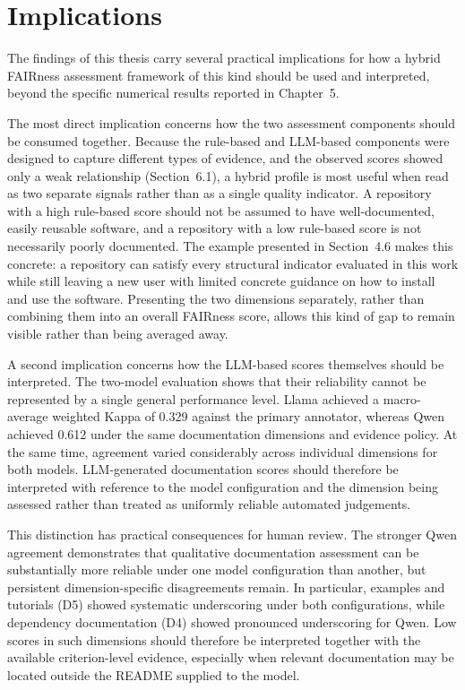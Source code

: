 \section{Implications}

The findings of this thesis carry several practical implications for
how a hybrid FAIRness assessment framework of this kind should be
used and interpreted, beyond the specific numerical results reported
in Chapter~5.

The most direct implication concerns how the two assessment
components should be consumed together. Because the rule-based and
LLM-based components were designed to capture different types of
evidence, and the observed scores showed only a weak relationship
(Section~6.1), a hybrid profile is most useful when read as two
separate signals rather than as a single quality indicator. A
repository with a high rule-based score should not be assumed to
have well-documented, easily reusable software, and a repository
with a low rule-based score is not necessarily poorly documented.
The example presented in Section~4.6 makes this concrete: a
repository can satisfy every structural indicator evaluated in
this work while still leaving a new user with limited concrete
guidance on how to install and use the software. Presenting
the two dimensions separately, rather than combining them into an
overall FAIRness score, allows this kind of gap to remain visible
rather than being averaged away.

A second implication concerns how the LLM-based scores themselves
should be interpreted. The two-model evaluation shows that their
reliability cannot be represented by a single general performance
level. Llama achieved a macro-average weighted Kappa of 0.329 against
the primary annotator, whereas Qwen achieved 0.612 under the same
documentation dimensions and evidence policy. At the same time,
agreement varied considerably across individual dimensions for both
models. LLM-generated documentation scores should therefore be
interpreted with reference to the model configuration and the
dimension being assessed rather than treated as uniformly reliable
automated judgements.

This distinction has practical consequences for human review. The
stronger Qwen agreement demonstrates that qualitative documentation
assessment can be substantially more reliable under one model
configuration than another, but persistent dimension-specific
disagreements remain. In particular, examples and tutorials (D5)
showed systematic underscoring under both configurations, while
dependency documentation (D4) showed pronounced underscoring for
Qwen. Low scores in such dimensions should therefore be interpreted
together with the available criterion-level evidence, especially when
relevant documentation may be located outside the README supplied to
the model.


